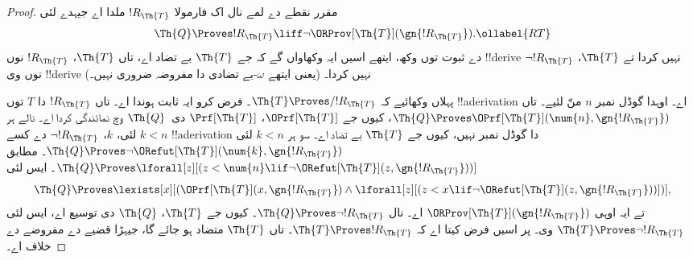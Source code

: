 \documentclass[../../../include/open-logic-section]{subfiles}
\begin{document}
\begin{proof}
مقرر نقطے دے لمے نال اک فارمولا $!R_\Th{T}$ ملدا اے جیہدے لئی
\begin{equation}
  \Th{Q} \Proves !R_\Th{T} \liff \lnot \ORProv[\Th{T}](\gn{!R_\Th{T}}).
  \ollabel{RT}
\end{equation}
 دے ثبوت توں وکھ،
ایتھے اسیں ایہ وکھاواں گے کہ جے $\Th{T}$ بے تضاد اے، تاں
$\Th{T}$، $!R_\Th{T}$ نوں !!{derive} نہیں کردا تے
$\Th{T}$، $\lnot !R_\Th{T}$ نوں وی !!{derive} نہیں کردا۔
(یعنی ایتھے $\omega$-بے تضادی دا مفروضہ ضروری نہیں۔)

پہلاں وکھائیے کہ $\Th{T} \Proves/ !R_{\Th{T}}$۔ فرض کرو
ایہ ثابت ہوندا اے۔ تاں $!R_{\Th{T}}$ دا $T$ توں
!!a{derivation} اے۔ اوہدا گوڈل نمبر $n$ منّ لئیے۔
تاں $\Th{Q} \Proves \OPrf[\Th{T}](\num{n}, \gn{!R_{\Th{T}}})$،
کیوں جے $\OPrf[\Th{T}]$، $\Prf[\Th{T}]$ دی~$\Th{Q}$
وچ نمائندگی کردا اے۔ نالے ہر $k < n$ لئی، $k$،
$\lnot !R_{\Th{T}}$ دے کسے !!a{derivation} دا گوڈل
نمبر نہیں، کیوں جے $\Th{T}$ بے تضاد اے۔ سو ہر $k < n$ لئی
$\Th{Q} \Proves \lnot
\ORefut[\Th{T}](\num{k}, \gn{!R_{\Th{T}}})$۔
 مطابق
$\Th{Q} \Proves \lforall[z][(z < \num{n} \lif \lnot \ORefut[\Th{T}](z,
  \gn{!R_{\Th{T}}}))]$۔ ایس لئی
\[
\Th{Q} \Proves \lexists[x][(\OPrf[\Th{T}](x,\gn{!R_{\Th{T}}}) \land \lforall[z][(z
    < x \lif \lnot \ORefut[\Th{T}](z,\gn{!R_{\Th{T}}}))])],
\]
تے ایہ اوہی $\ORProv[\Th{T}](\gn{!R_{\Th{T}}})$ اے۔
 نال $\Th{Q} \Proves \lnot !R_{\Th{T}}$۔
کیوں جے $\Th{T}$، $\Th{Q}$ دی توسیع اے، ایس لئی
$\Th{T} \Proves \lnot !R_{\Th{T}}$ وی۔ پر اسیں فرض کیتا اے کہ
$\Th{T} \Proves !R_{\Th{T}}$۔ تاں $\Th{T}$ متضاد ہو جائے گا،
جیہڑا قضیے دے مفروضے دے خلاف اے۔


\end{proof}
\end{document}
